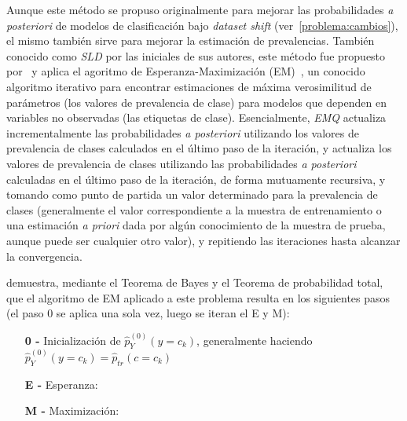 Aunque este método se propuso originalmente para mejorar las probabilidades {\it
a posteriori\/} de modelos de clasificación bajo {\it dataset shift\/}
(ver~\ref{problema:cambios}), el mismo también sirve para mejorar la estimación
de prevalencias. También conocido como {\it SLD\/} por las iniciales de sus
autores, este método fue propuesto por~\citet{saerens2002adjusting} y aplica el
agoritmo de Esperanza-Maximización (EM)~\cite{dempster1977maximum}, un conocido
algoritmo iterativo para encontrar estimaciones de máxima verosimilitud de
parámetros (los valores de prevalencia de clase) para modelos que dependen en
variables no observadas (las etiquetas de clase). Esencialmente, {\it EMQ\/}
actualiza incrementalmente las probabilidades {\it a posteriori\/} utilizando
los valores de prevalencia de clases calculados en el último paso de la
iteración, y actualiza los valores de prevalencia de clases utilizando las
probabilidades {\it a posteriori\/} calculadas en el último paso de la
iteración, de forma mutuamente recursiva, y tomando como punto de partida un
valor determinado para la prevalencia de clases (generalmente el valor
correspondiente a la muestra de entrenamiento o una estimación {\it a priori\/}
dada por algún conocimiento de la muestra de prueba, aunque puede ser cualquier
otro valor), y repitiendo las iteraciones hasta alcanzar la convergencia.

\citet[Apéndice, p.23 a p.25]{saerens2002adjusting} demuestra, mediante el
Teorema de Bayes y el Teorema de probabilidad total, que el algoritmo de EM
aplicado a este problema resulta en los siguientes pasos (el paso 0 se aplica
una sola vez, luego se iteran el E y M):

\begin{enumerate}[leftmargin=*, labelindent=16pt]

    \item[\bf{0 -}] Inicialización de $\hat p^{(0)}_{Y}(y=c_k)$, generalmente
    haciendo $\hat p^{(0)}_{Y}(y=c_k) = \hat p_{tr}(c=c_k)$

    \item[\bf{E -}] Esperanza: \hspace*{\fill}

    \item[\bf{M -}] Maximización: \hspace*{\fill}

\end{enumerate}

